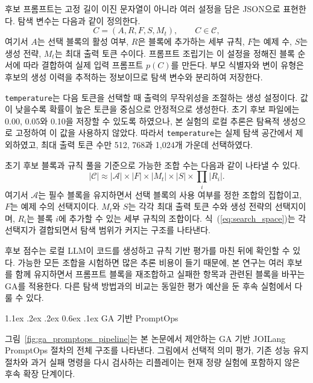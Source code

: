 \documentclass[10pt,twocolumn]{article}
\makeatletter
\newcommand{\rev}[1]{{\color{revisionblue}#1}}
\newenvironment{revision}{\begingroup\color{revisionblue}}{\endgroup}
\renewcommand{\section}{\@startsection{section}{1}{\z@}%
{1.1ex \@plus .2ex \@minus .2ex}%
{0.6ex \@plus .1ex}%
{\normalfont\normalsize\bfseries}}
\makeatother
\begin{document}
\begin{revision}
후보 프롬프트는 고정 길이 이진 문자열이 아니라 여러 설정을 담은 JSON으로 표현한다. 탐색 변수는 다음과 같이 정의한다.
\begin{equation}
C = (A, R, F, S, M_t), \qquad C \in \mathcal{C},
\label{eq:genotype}
\end{equation}
여기서 $A$는 선택 블록의 활성 여부, $R$은 블록에 추가하는 세부 규칙, $F$는 예제 수, $S$는 생성 전략, $M_t$는 최대 출력 토큰 수이다. 프롬프트 조립기는 이 설정을 정해진 블록 순서에 따라 결합하여 실제 입력 프롬프트 $p(C)$를 만든다. 부모 식별자와 변이 유형은 후보의 생성 이력을 추적하는 정보이므로 탐색 변수와 분리하여 저장한다.

\texttt{temperature}는 다음 토큰을 선택할 때 출력의 무작위성을 조절하는 생성 설정이다. 값이 낮을수록 확률이 높은 토큰을 중심으로 안정적으로 생성한다. 초기 후보 파일에는 0.00, 0.05와 0.10을 저장할 수 있도록 하였으나, 본 실험의 로컬 추론은 탐욕적 생성으로 고정하여 이 값을 사용하지 않았다. 따라서 \texttt{temperature}는 실제 탐색 공간에서 제외하였고, 최대 출력 토큰 수만 512, 768과 1{,}024개 가운데 선택하였다.

초기 후보 블록과 규칙 풀을 기준으로 가능한 조합 수는 다음과 같이 나타낼 수 있다.
\begin{equation}
|\mathcal{C}| \approx
|\mathcal{A}| \times |F| \times |M_t| \times |S| \times \prod_i |R_i|.
\label{eq:search_space}
\end{equation}
여기서 $\mathcal{A}$는 필수 블록을 유지하면서 선택 블록의 사용 여부를 정한 조합의 집합이고, $F$는 예제 수의 선택지이다. $M_t$와 $S$는 각각 최대 출력 토큰 수와 생성 전략의 선택지이며, $R_i$는 블록 $i$에 추가할 수 있는 세부 규칙의 조합이다. 식~(\ref{eq:search_space})는 각 선택지가 결합되면서 탐색 범위가 커지는 구조를 나타낸다.
\end{revision}

후보 점수는 로컬 LLM이 코드를 생성하고 규칙 기반 평가를 마친 뒤에 확인할 수 있다. 가능한 모든 조합을 시험하면 많은 추론 비용이 들기 때문에, 본 연구는 여러 후보를 함께 유지하면서 프롬프트 블록을 재조합하고 실패한 항목과 관련된 블록을 바꾸는 GA를 적용한다. 다른 탐색 방법과의 비교는 동일한 평가 예산을 둔 후속 실험에서 다룰 수 있다.

\FloatBarrier

\section{GA 기반 PromptOps}

\rev{그림~\ref{fig:ga_promptops_pipeline}는 본 논문에서 제안하는 GA 기반 JOILang PromptOps 절차의 전체 구조를 나타낸다. 그림에서 선택적 의미 평가, 기존 성능 유지 절차와 과거 실패 명령을 다시 검사하는 리플레이는 현재 정량 실험에 포함하지 않은 후속 확장 단계이다.}
\end{document}
